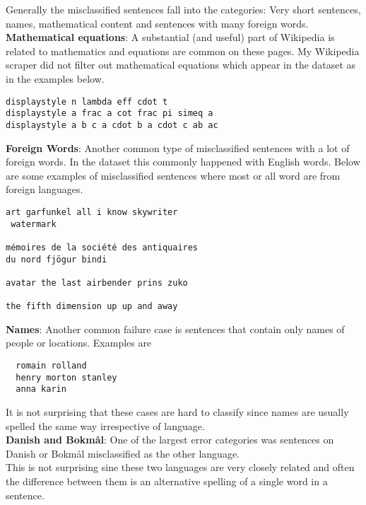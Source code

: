 Generally the misclassified sentences fall into the categories: Very short sentences, names, mathematical content and sentences with many foreign words.\\

\textbf{Mathematical equations}:
A substantial (and useful) part of Wikipedia is related to mathematics and equations are common on these pages. My Wikipedia scraper did not filter out mathematical equations which appear in the dataset as in the examples below. \\

\begin{verbatim}
displaystyle n lambda eff cdot t
displaystyle a frac a cot frac pi simeq a
displaystyle a b c a cdot b a cdot c ab ac
\end{verbatim}

\textbf{Foreign Words}:
Another common type of misclassified sentences with a lot of foreign words. In the dataset this commonly happened with English words. Below are some examples of misclassified sentences where most or all word are from foreign languages. \\

\begin{verbatim}
art garfunkel all i know skywriter
 watermark

mémoires de la société des antiquaires
du nord fjögur bindi

avatar the last airbender prins zuko

the fifth dimension up up and away
\end{verbatim}


\textbf{Names}: Another common failure case is sentences that contain only names of people or locations. Examples are
\begin{verbatim}
  romain rolland
  henry morton stanley
  anna karin
\end{verbatim}

It is not surprising that these cases are hard to classify since names are usually spelled the same way irrespective of language. \\

\textbf{Danish and Bokmål}:
One of the largest error categories was sentences on Danish or Bokmål misclassified as the other language.\\

This is not surprising sine these two languages are very closely related and often the difference between them is an alternative spelling of a single word in a sentence. \\

